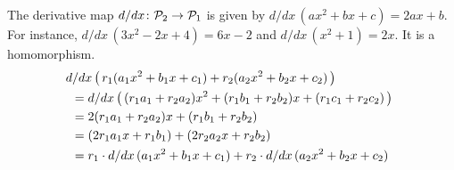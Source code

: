 \documentclass[10pt,t]{beamer}
\begin{document}
\begin{frame}
\ex
The derivative map $\mbox{$d/dx\colon \mathcal{P}_2\to \mathcal{P}_1$}$
is given by $d/dx\,(ax^2+bx+c)=2ax+b$.
For instance, $d/dx\,(3x^2-2x+4)=6x-2$
and $d/dx\,(x^2+1)=2x$.
\pause
It is a homomorphism.
\begin{multline*}
  d/dx\,\big(\,r_1(a_1x^2+b_1x+c_1)+r_2(a_2x^2+b_2x+c_2)\,\big)  \hspace*{5em}  \\
  \begin{aligned} 
    &=d/dx\,\big(\,(r_1a_1+r_2a_2)x^2+(r_1b_1+r_2b_2)x+(r_1c_1+r_2c_2)\,\big)   \\
    &=2(r_1a_1+r_2a_2)x+(r_1b_1+r_2b_2)   \\
    &=(2r_1a_1x+r_1b_1)+(2r_2a_2x+r_2b_2)   \\
    &=r_1\cdot d/dx\,(a_1x^2+b_1x+c_1)
      +r_2\cdot d/dx\,(a_2x^2+b_2x+c_2)
  \end{aligned}
\end{multline*}
\end{frame}
\end{document}

